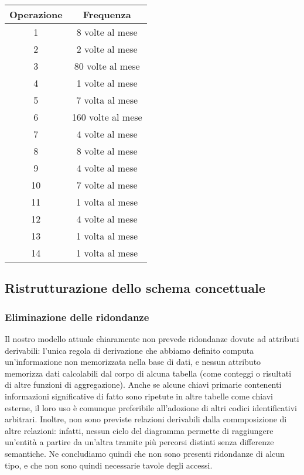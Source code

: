 \documentclass{article}
\begin{document}
\begin{center}\begin{tabular}{ |c|c| }
		\hline
		\textbf{Operazione} & \textbf{Frequenza} \\
		\hline
		1                   & 8 volte al mese    \\
		\hline
		2                   & 2 volte al mese    \\
		\hline
		3                   & 80 volte al mese   \\
		\hline
		4                   & 1 volte al mese    \\
		\hline
		5                   & 7 volta al mese    \\
		\hline
		6                   & 160 volte al mese  \\
		\hline
		7                   & 4 volte al mese    \\
		\hline
		8                   & 8 volte al mese    \\
		\hline
		9                   & 4 volte al mese    \\
		\hline
		10                  & 7 volte al mese    \\
		\hline
		11                  & 1 volta al mese    \\
		\hline
		12                  & 4 volte al mese    \\
		\hline
		13                  & 1 volta al mese    \\
		\hline
		14                  & 1 volta al mese    \\
		\hline
	\end{tabular}\end{center}

\subsection{Ristrutturazione dello schema concettuale}

\subsubsection{Eliminazione delle ridondanze}

Il nostro modello attuale chiaramente non prevede ridondanze dovute ad attributi
derivabili: l'unica regola di derivazione che abbiamo definito computa
un'informazione non memorizzata nella base di dati, e nessun attributo memorizza
dati calcolabili dal corpo di alcuna tabella (come conteggi o risultati di altre
funzioni di aggregazione). Anche se alcune chiavi primarie contenenti
informazioni significative di fatto sono ripetute in altre tabelle come chiavi
esterne, il loro uso è comunque preferibile all'adozione di altri codici
identificativi arbitrari. Inoltre, non sono previste relazioni derivabili dalla
commposizione di altre relazioni: infatti, nessun ciclo del diagramma permette
di raggiungere un'entità a partire da un'altra tramite più percorsi distinti
senza differenze semantiche. Ne concludiamo quindi che non sono presenti
ridondanze di alcun tipo, e che non sono quindi necessarie tavole degli accessi.
\end{document}
